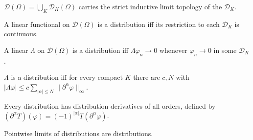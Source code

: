 
\begin{theorem}
  \label{thm:testFunctions-inductiveLimit}
  \leanok
  $\mathcal D(\Omega) = \bigcup_K \mathcal D_K(\Omega)$ carries the
  strict inductive limit topology of the $\mathcal D_K$.
\end{theorem}

\begin{theorem}
  \label{thm:distribution-iff-DK}
  \leanok
  A linear functional on $\mathcal D(\Omega)$ is a distribution iff
  its restriction to each $\mathcal D_K$ is continuous.
\end{theorem}

\begin{theorem}
  \label{thm:distribution-sequential}
  \leanok
  A linear $\Lambda$ on $\mathcal D(\Omega)$ is a distribution iff
  $\Lambda \varphi_n \to 0$ whenever $\varphi_n \to 0$ in some
  $\mathcal D_K$.
\end{theorem}

\begin{theorem}
  \label{thm:distribution-seminorm}
  \leanok
  $\Lambda$ is a distribution iff for every compact $K$ there are
  $c, N$ with
  $|\Lambda \varphi| \le c \sum_{|\alpha| \le N} \|\partial^\alpha
  \varphi\|_\infty$.
\end{theorem}

\begin{theorem}
  \label{thm:distribution-derivative}
  \leanok
  Every distribution has distribution derivatives of all orders,
  defined by $(\partial^\alpha T)(\varphi) = (-1)^{|\alpha|}
  T(\partial^\alpha \varphi)$.
\end{theorem}

\begin{theorem}
  \label{thm:distributions-seqComplete}
  \leanok
  Pointwise limits of distributions are distributions.
\end{theorem}

